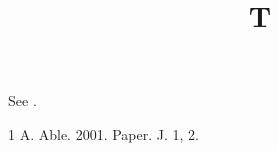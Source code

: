 \documentclass[sigconf]{acmart}
\begin{document}
\title{T}
\maketitle
See \cite{a}.
\begin{thebibliography}{1}
 A. Able. 2001. Paper. J. 1, 2.
\end{thebibliography}
\end{document}
